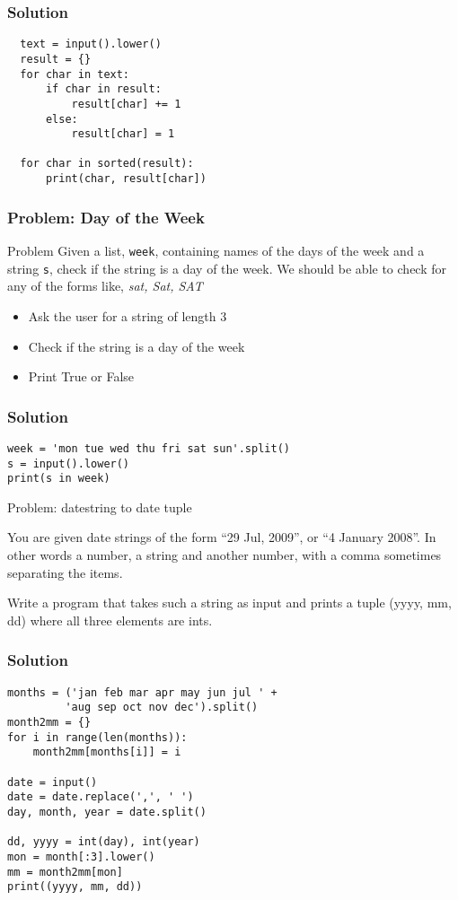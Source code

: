 \documentclass[14pt,compress]{beamer}
\begin{document}
\begin{frame}
\frametitle{Solution}
\begin{lstlisting}
  text = input().lower()
  result = {}
  for char in text:
      if char in result:
          result[char] += 1
      else:
          result[char] = 1

  for char in sorted(result):
      print(char, result[char])
\end{lstlisting}
\end{frame}

\begin{frame}[plain]
  \frametitle{Problem: Day of the Week}
  \begin{block}{Problem}
    Given a list, \texttt{week}, containing names of the days of the
    week and a string \texttt{s}, check if the string is a day of the
    week. We should be able to check for any of the forms like,
    \emph{sat, Sat, SAT}
  \end{block}
  \begin{itemize}
  \item Ask the user for a string of length 3
  \item Check if the string is a day of the week
  \item Print True or False
  \end{itemize}
\end{frame}

\begin{frame}
  \frametitle{Solution}
  \small
  \begin{lstlisting}
week = 'mon tue wed thu fri sat sun'.split()
s = input().lower()
print(s in week)
\end{lstlisting}
\end{frame}


\begin{frame}[plain]
  {Problem: datestring to date tuple}

  You are given date strings of the form ``29 Jul, 2009'', or ``4 January
  2008''. In other words a number, a string and another number, with a comma
  sometimes separating the items.

  Write a program that takes such a string as input and prints a tuple (yyyy,
  mm, dd) where all three elements are ints.
\end{frame}

\begin{frame}[fragile]
  \frametitle{Solution}
 \small
  \begin{lstlisting}
months = ('jan feb mar apr may jun jul ' +
         'aug sep oct nov dec').split()
month2mm = {}
for i in range(len(months)):
    month2mm[months[i]] = i

date = input()
date = date.replace(',', ' ')
day, month, year = date.split()

dd, yyyy = int(day), int(year)
mon = month[:3].lower()
mm = month2mm[mon]
print((yyyy, mm, dd))
\end{lstlisting}
\end{frame}
\end{document}
